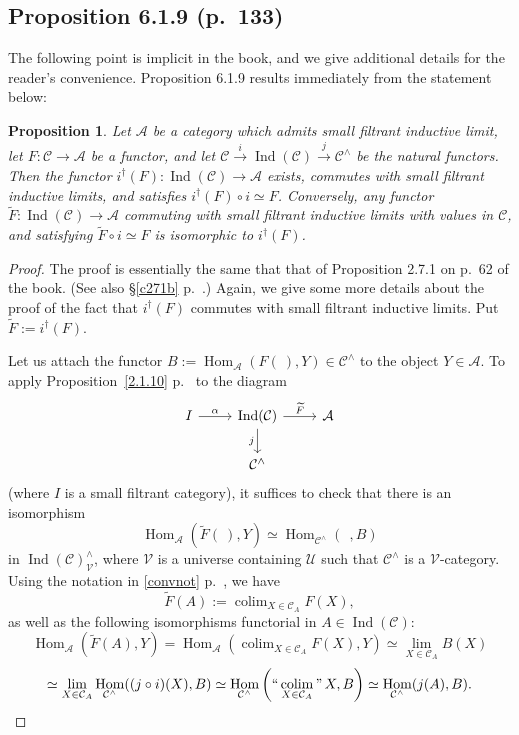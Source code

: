 \documentclass[12pt]{article}
\newtheorem{prop}[thm]{Proposition}
\theoremstyle{remark}
\theoremstyle{definition}
\newcommand{\A}{\mathcal A}
\newcommand{\C}{\mathcal C}
\newcommand{\U}{\mathcal U}
\newcommand{\V}{\mathcal V}
\DeclareMathOperator*{\coli}{colim}
\DeclareMathOperator*{\icolim}{``\coli"}
\DeclareMathOperator{\Hom}{Hom}%
\DeclareMathOperator{\Ind}{Ind}
\begin{document}
\subsection{Proposition 6.1.9 (p.~133)}\label{619}
%
The following point is implicit in the book, and we give additional details for the reader's convenience. Proposition 6.1.9 results immediately from the statement below:
%
\begin{prop} 
Let $\A$ be a category which admits small filtrant inductive limit, let $F:\C\to\A$ be a functor, and let $\C\overset{i}{\to}\Ind(\C)\overset{j}{\to}\C^\wedge$ be the natural functors. Then the functor $i^\dagger(F):\Ind(\C)\to\A$ exists, commutes with small filtrant inductive limits, and satisfies $i^\dagger(F)\circ i\simeq F$. Conversely, any functor $\widetilde F:\Ind(\C)\to\A$ commuting with small filtrant inductive limits with values in $\C$, and satisfying $\widetilde F\circ i\simeq F$ is isomorphic to $i^\dagger(F)$. 
\end{prop} 
%
\begin{proof}
The proof is essentially the same that that of Proposition 2.7.1 on p.~62 of the book. (See also \S\ref{c271b} p.~\pageref{c271b}.) Again, we give some more details about the proof of the fact that $i^\dagger(F)$ commutes with small filtrant inductive limits. Put $\widetilde F:=i^\dagger(F)$. 

Let us attach the functor $B:=\Hom_\A(F(\ ),Y)\in\C^\wedge$ to the object $Y\in\A$. To apply Proposition~\ref{2.1.10} p.~\pageref{2.1.10} to the diagram 
$$
\begin{tikzcd}
I\ar{r}{\alpha}&\Ind(\C)\ar{d}[swap]{j}\ar{r}{\widetilde F}&\A\\
&\C^\wedge
\end{tikzcd}
$$
(where $I$ is a small filtrant category), it suffices to check that there is an isomorphism 
$$
\Hom_\A\left(\widetilde F(\ ),Y\right)\simeq
\Hom_{\C^\wedge}(\ \ ,B)
$$ 
in $\Ind(\C)^\wedge_\V$, where $\V$ is a universe containing $\U$ such that $\C^\wedge$ is a $\V$-category. Using the notation in \eqref{convnot} p.~\pageref{convnot}, we have 
$$
\widetilde F(A):=\coli_{X\in\C_A}F(X),
$$ 
as well as the following isomorphisms functorial in $A\in\Ind(\C)$:
$$
\Hom_\A\left(\widetilde F(A),Y\right)=
\Hom_\A\left(\coli_{X\in\C_A}F(X),Y\right)\simeq
\lim_{X\in\C_A}B(X)
$$
$$
\simeq
\lim_{X\in\C_A}\Hom_{\C^\wedge}((j\circ i)(X),B)
\simeq
\Hom_{\C^\wedge}\left(\icolim_{X\in\C_A}X,B\right)\simeq
\Hom_{\C^\wedge}(j(A),B).
$$
\end{proof}
\end{document}
